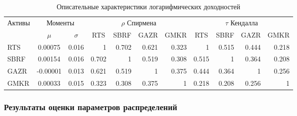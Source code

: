 \begin{table}[htb]
    \centering
    \caption{Описательные  характеристики логарифмических доходностей}
    \label{tab:assets}
    \begin{adjustbox}{max width=\textwidth}
    \begin{tabular}{l|cc|rrrr|rrrr}
        \toprule
        \multirow{2}{*}{Активы} & \multicolumn{2}{c|}{Моменты} & \multicolumn{4}{c|}{$\rho$ Спирмена} & \multicolumn{4}{c}{$\tau$ Кендалла} \\
        & $\mu$ & $\sigma$ & \multicolumn{1}{c}{RTS} & \multicolumn{1}{c}{SBRF} & \multicolumn{1}{c}{GAZR} & \multicolumn{1}{c|}{GMKR} & \multicolumn{1}{c}{RTS} & \multicolumn{1}{c}{SBRF} & \multicolumn{1}{c}{GAZR} & \multicolumn{1}{c}{GMKR} \\ 
        \midrule
RTS  &  0.00075 & 0.016 &     1 & 0.702 & 0.621 & 0.323 &     1 & 0.515 & 0.444 & 0.218 \\
SBRF &  0.00154 & 0.016 & 0.702 &     1 & 0.519 & 0.308 & 0.515 &     1 & 0.364 & 0.208 \\
GAZR & -0.00001 & 0.013 & 0.621 & 0.519 &     1 & 0.375 & 0.444 & 0.364 &     1 & 0.256 \\
GMKR &  0.00033 & 0.015 & 0.323 & 0.308 & 0.375 &     1 & 0.218 & 0.208 & 0.256 &     1 \\    
        \bottomrule
    \end{tabular}
    \end{adjustbox}
\end{table}


\subsubsection{Результаты оценки параметров распределений}
\label{calibration:marginals}

